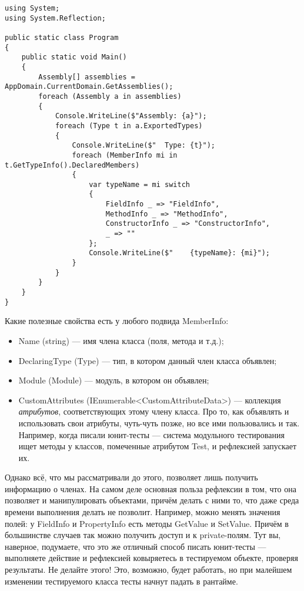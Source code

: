 \documentclass{../../text-style}
\begin{document}
\begin{verbatim}
using System;
using System.Reflection;

public static class Program
{
    public static void Main()
    {
        Assembly[] assemblies = AppDomain.CurrentDomain.GetAssemblies();
        foreach (Assembly a in assemblies)
        {
            Console.WriteLine($"Assembly: {a}");
            foreach (Type t in a.ExportedTypes)
            {
                Console.WriteLine($"  Type: {t}");
                foreach (MemberInfo mi in t.GetTypeInfo().DeclaredMembers)
                {
                    var typeName = mi switch
                    {
                        FieldInfo _ => "FieldInfo",
                        MethodInfo _ => "MethodInfo",
                        ConstructorInfo _ => "ConstructorInfo",
                        _ => ""
                    };
                    Console.WriteLine($"    {typeName}: {mi}");
                }
            }
        }
    }
}
\end{verbatim}

Какие полезные свойства есть у любого подвида MemberInfo:

\begin{itemize}
    \item Name (string) --- имя члена класса (поля, метода и т.д.);
    \item DeclaringType (Type) --- тип, в котором данный член класса объявлен;
    \item Module (Module) --- модуль, в котором он объявлен;
    \item CustomAttributes (IEnumerable<CustomAttributeData>) --- коллекция \textit{атрибутов}, соответствующих этому члену класса. Про то, как объявлять и использовать свои атрибуты, чуть-чуть позже, но все ими пользовались и так. Например, когда писали юнит-тесты --- система модульного тестирования ищет методы у классов, помеченные атрибутом Test, и рефлексией запускает их.
\end{itemize}

Однако всё, что мы рассматривали до этого, позволяет лишь получить информацию о членах. На самом деле основная польза рефлексии в том, что она позволяет и манипулировать объектами, причём делать с ними то, что даже среда времени выполнения делать не позволит. Например, можно менять значения полей: у FieldInfo и PropertyInfo есть методы GetValue и SetValue. Причём в большинстве случаев так можно получить доступ и к private-полям. Тут вы, наверное, подумаете, что это же отличный способ писать юнит-тесты --- выполняете действие и рефлексией ковыряетесь в тестируемом объекте, проверяя результаты. Не делайте этого! Это, возможно, будет работать, но при малейшем изменении тестируемого класса тесты начнут падать в рантайме.
\end{document}
